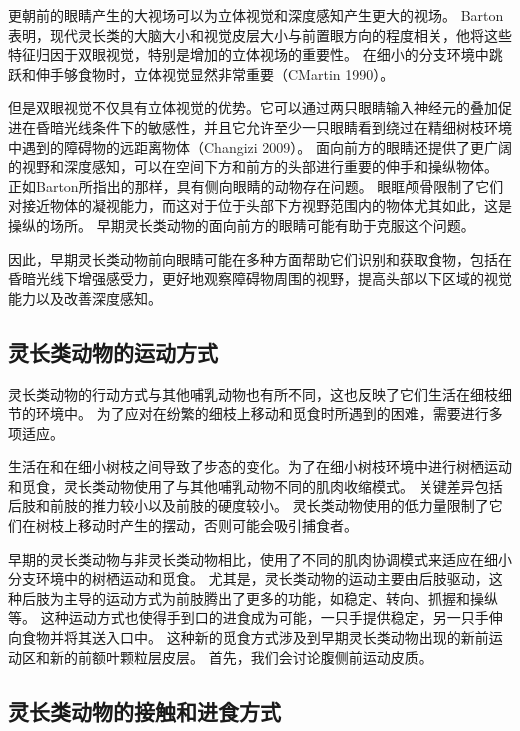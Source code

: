 更朝前的眼睛产生的大视场可以为立体视觉和深度感知产生更大的视场。
Barton\cite{barton1998visual}表明，现代灵长类的大脑大小和视觉皮层大小与前置眼方向的程度相关，他将这些特征归因于双眼视觉，特别是增加的立体视场的重要性。
在细小的分支环境中跳跃和伸手够食物时，立体视觉显然非常重要\cite{cartmill1974rethinking}（CMartin 1990）。


但是双眼视觉不仅具有立体视觉的优势。它可以通过两只眼睛输入神经元的叠加促进在昏暗光线条件下的敏感性\cite{crescitelli1977topography,allman1999evolving}，并且它允许至少一只眼睛看到绕过在精细树枝环境中遇到的障碍物的远距离物体（Changizi 2009）。
面向前方的眼睛还提供了更广阔的视野和深度感知，可以在空间下方和前方的头部进行重要的伸手和操纵物体\cite{barton2004binocularity}。
正如Barton所指出的那样，具有侧向眼睛的动物存在问题。
眼眶颅骨限制了它们对接近物体的凝视能力，而这对于位于头部下方视野范围内的物体尤其如此，这是操纵的场所。
早期灵长类动物的面向前方的眼睛可能有助于克服这个问题。


因此，早期灵长类动物前向眼睛可能在多种方面帮助它们识别和获取食物，包括在昏暗光线下增强感受力，更好地观察障碍物周围的视野，提高头部以下区域的视觉能力以及改善深度感知。



\subsection{灵长类动物的运动方式}

灵长类动物的行动方式与其他哺乳动物也有所不同，这也反映了它们生活在细枝细节的环境中。
为了应对在纷繁的细枝上移动和觅食时所遇到的困难，需要进行多项适应。


生活在和在细小树枝之间导致了步态的变化。为了在细小树枝环境中进行树栖运动和觅食，灵长类动物使用了与其他哺乳动物不同的肌肉收缩模式\cite{larson1998unique}。
关键差异包括后肢和前肢的推力较小以及前肢的硬度较小\cite{schmitt2010primate}。
灵长类动物使用的低力量限制了它们在树枝上移动时产生的摆动，否则可能会吸引捕食者。


早期的灵长类动物与非灵长类动物相比，使用了不同的肌肉协调模式来适应在细小分支环境中的树栖运动和觅食。
尤其是，灵长类动物的运动主要由后肢驱动，这种后肢为主导的运动方式为前肢腾出了更多的功能，如稳定、转向、抓握和操纵等。
这种运动方式也使得手到口的进食成为可能，一只手提供稳定，另一只手伸向食物并将其送入口中。
这种新的觅食方式涉及到早期灵长类动物出现的新前运动区和新的前额叶颗粒层皮层。
首先，我们会讨论腹侧前运动皮质。



\subsection{灵长类动物的接触和进食方式}

